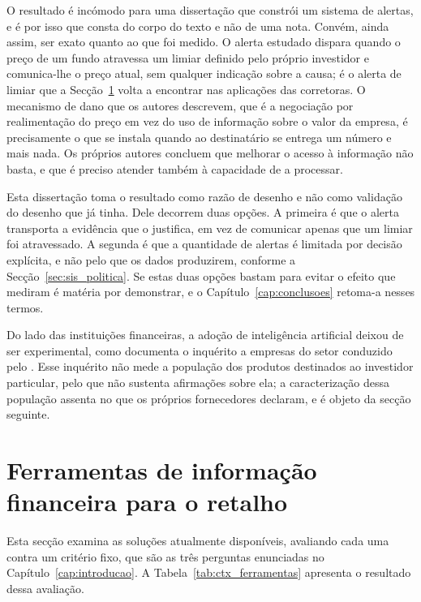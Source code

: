 O resultado é incómodo para uma dissertação que constrói um sistema de alertas, e é por isso que
consta do corpo do texto e não de uma nota. Convém, ainda assim, ser exato quanto ao que foi
medido. O alerta estudado dispara quando o preço de um fundo atravessa um limiar definido pelo
próprio investidor e comunica-lhe o preço atual, sem qualquer indicação sobre a causa; é o alerta
de limiar que a Secção~\ref{sec:ctx_ferramentas} volta a encontrar nas aplicações das corretoras. O
mecanismo de dano que os autores descrevem, que é a negociação por realimentação do preço em vez
do uso de informação sobre o valor da empresa, é precisamente o que se instala quando ao
destinatário se entrega um número e mais nada. Os próprios autores concluem que melhorar o acesso à
informação não basta, e que é preciso atender também à capacidade de a processar.

Esta dissertação toma o resultado como razão de desenho e não como validação do desenho que já
tinha. Dele decorrem duas opções. A primeira é que o alerta transporta a evidência que o justifica,
em vez de comunicar apenas que um limiar foi atravessado. A segunda é que a quantidade de alertas é
limitada por decisão explícita, e não pelo que os dados produzirem, conforme a
Secção~\ref{sec:sis_politica}. Se estas duas opções bastam para evitar o efeito que
\textcite{liu2023alerts} mediram é matéria por demonstrar, e o Capítulo~\ref{cap:conclusoes}
retoma-a nesses termos.

Do lado das instituições financeiras, a adoção de inteligência artificial deixou de ser
experimental, como documenta o inquérito a empresas do setor conduzido pelo
\textcite{ccaf2026aifs}. Esse inquérito não mede a população dos produtos destinados ao investidor
particular, pelo que não sustenta afirmações sobre ela; a caracterização dessa população assenta no
que os próprios fornecedores declaram, e é objeto da secção seguinte.

\section{Ferramentas de informação financeira para o retalho}
\label{sec:ctx_ferramentas}

Esta secção examina as soluções atualmente disponíveis, avaliando cada uma contra um critério fixo,
que são as três perguntas enunciadas no Capítulo~\ref{cap:introducao}. A
Tabela~\ref{tab:ctx_ferramentas} apresenta o resultado dessa avaliação.

